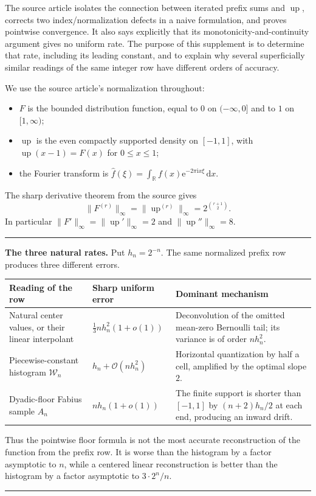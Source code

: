 \documentclass[11pt,oneside]{article}
\theoremstyle{definition}
\theoremstyle{remark}
\newcommand{\R}{\mathbb R}
\newcommand{\Up}{\operatorname{up}}
\newcommand{\e}{\mathrm e}
\newcommand{\ii}{\mathrm i}
\newcommand{\dd}{\,\mathrm d}
\newcommand{\bigO}{\mathcal O}
\newenvironment{boxedremark}{%
  \par\smallskip\noindent\begin{center}\begin{minipage}{0.94\textwidth}%
  \color{black}\hrule\vspace{0.6em}\small
}{%
  \vspace{0.6em}\hrule\end{minipage}\end{center}\smallskip
}
\begin{document}
The source article \cite{tmrates:reshetnikovExposition} isolates the connection between iterated
prefix sums and $\Up$, corrects two index/normalization defects in a naive formulation, and
proves pointwise convergence.  It also says explicitly that its monotonicity-and-continuity
argument gives no uniform rate.  The purpose of this supplement is to determine that rate,
including its leading constant, and to explain why several superficially similar readings of
the same integer row have different orders of accuracy.

We use the source article's normalization throughout:
\begin{itemize}
\item $F$ is the bounded distribution function, equal to $0$ on $(-\infty,0]$ and to $1$ on
      $[1,\infty)$;
\item $\Up$ is the even compactly supported density on $[-1,1]$, with
      $\Up(x-1)=F(x)$ for $0\le x\le1$;
\item the Fourier transform is
      $\widehat f(\xi)=\int_{\R}f(x)\e^{-2\pi\ii x\xi}\dd x$.
\end{itemize}
The sharp derivative theorem from the source gives
\begin{equation}
 \|F^{(r)}\|_\infty=\|\Up^{(r)}\|_\infty
 =2^{\binom{r+1}{2}}.                                      \label{tmrates:eq:sharp-derivatives}
\end{equation}
In particular $\|F'\|_\infty=\|\Up'\|_\infty=2$ and
$\|\Up''\|_\infty=8$.

\begin{boxedremark}
\textbf{The three natural rates.}
Put $h_n=2^{-n}$.  The same normalized prefix row produces three different errors.
\begin{center}
\begin{tabularx}{0.95\textwidth}{@{}>{\raggedright\arraybackslash}p{}
>{\raggedright\arraybackslash}p{}X@{}}
\toprule
Reading of the row & Sharp uniform error & Dominant mechanism\\
\midrule
Natural center values, or their linear interpolant
& $\displaystyle \frac13 n h_n^2(1+o(1))$
& Deconvolution of the omitted mean-zero Bernoulli tail; its variance is of order $nh_n^2$.\\[0.35em]
Piecewise-constant histogram $\mathcal W_n$
& $\displaystyle h_n+\bigO(nh_n^2)$
& Horizontal quantization by half a cell, amplified by the optimal slope $2$.\\[0.35em]
Dyadic-floor Fabius sample $A_n$
& $\displaystyle n h_n(1+o(1))$
& The finite support is shorter than $[-1,1]$ by $(n+2)h_n/2$ at each end, producing an inward drift.\\
\bottomrule
\end{tabularx}
\end{center}
Thus the pointwise floor formula is not the most accurate reconstruction of the function from
the prefix row.  It is worse than the histogram by a factor asymptotic to $n$, while a
centered linear reconstruction is better than the histogram by a factor asymptotic to
$3\cdot2^n/n$.
\end{boxedremark}
\end{document}
